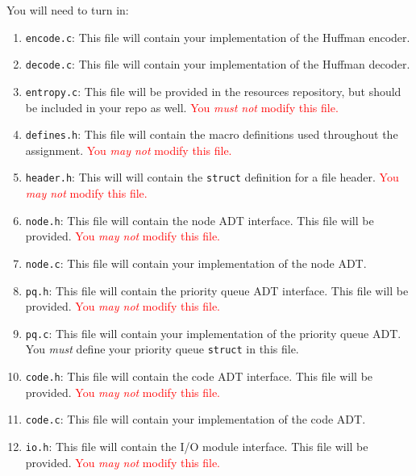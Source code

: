 \documentclass[11pt]{article}
\begin{document}
\noindent You will need to turn in:
\begin{enumerate}
  \item \texttt{encode.c}: This file will contain your implementation of the
    Huffman encoder.

  \item \texttt{decode.c}: This file will contain your implementation of the
    Huffman decoder.

  \item \texttt{entropy.c}: This file will be provided in the resources
    repository, but should be included in your repo as well.
    \textcolor{red}{You \emph{must not} modify this file.}

  \item \texttt{defines.h}: This file will contain the macro definitions
    used throughout the assignment. \textcolor{red}{You \emph{may not}
    modify this file.}

  \item \texttt{header.h}: This will will contain the \texttt{struct}
    definition for a file header. \textcolor{red}{You \emph{may not}
    modify this file.}

  \item \texttt{node.h}: This file will contain the node ADT interface.
    This file will be provided. \textcolor{red}{You \emph{may not}
    modify this file.}

  \item \texttt{node.c}: This file will contain your implementation of
    the node ADT.

  \item \texttt{pq.h}: This file will contain the priority queue ADT
    interface. This file will be provided. \textcolor{red}{You \emph{may
    not} modify this file.}

  \item \texttt{pq.c}: This file will contain your implementation of the
    priority queue ADT. You \emph{must} define your priority queue
    \texttt{struct} in this file.

  \item \texttt{code.h}: This file will contain the code ADT interface.
    This file will be provided. \textcolor{red}{You \emph{may not}
    modify this file.}

  \item \texttt{code.c}: This file will contain your implementation of
    the code ADT.

  \item \texttt{io.h}: This file will contain the I/O module interface.
    This file will be provided. \textcolor{red}{You \emph{may not}
    modify this file.}


\end{enumerate}
\end{document}
